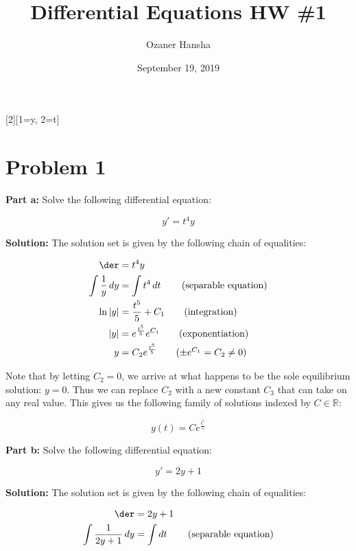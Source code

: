 \documentclass{article}
\begin{document}
\title{Differential Equations HW \#1}
\author{Ozaner Hansha}
\date{September 19, 2019}
\maketitle

[2][1=y, 2=t]{}

\section*{Problem 1}
\noindent\textbf{Part a:} Solve the following differential equation:

\begin{equation*}
    y'=t^4y
\end{equation*}

\noindent\textbf{Solution:} The solution set is given by the following chain of equalities:

\begin{align*}
    \der&=t^4y\\
    \int \frac{1}{y}\mathop{dy}&=\int t^4\mathop{dt}\tag{separable equation}\\
    \ln{|y|}&=\frac{t^5}{5}+C_1\tag{integration}\\
    |y|&=e^{\frac{t^5}{5}}e^{C_1}\tag{exponentiation}\\
    y&=C_2e^{\frac{t^5}{5}}\tag{$\pm e^{C_1}=C_2\not=0$}
\end{align*}

Note that by letting $C_2=0$, we arrive at what happens to be the sole equilibrium solution: $y=0$. Thus we can replace $C_2$ with a new constant $C_3$ that can take on any real value. This gives us the following family of solutions indexed by $C\in\mathbb R$:

\begin{equation*}
    y(t)=Ce^{\frac{t^5}{5}}
\end{equation*}
\smallskip

\noindent\textbf{Part b:} Solve the following differential equation:

\begin{equation*}
    y'=2y+1
\end{equation*}

\noindent\textbf{Solution:} The solution set is given by the following chain of equalities:

\begin{align*}
    \der&=2y+1\\
    \int \frac{1}{2y+1}\mathop{dy}&=\int\mathop{dt}\tag{separable equation}
\end{align*}
\pagebreak
\end{document}

